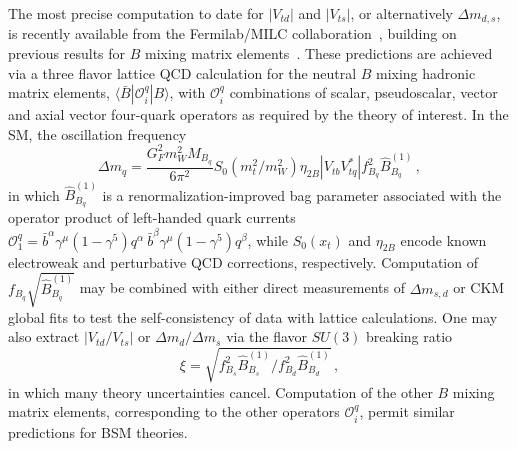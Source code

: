 The most precise computation to date for $|V_{td}|$ and $|V_{ts}|$, or alternatively $\Delta m_{d,s}$, is recently available from the Fermilab/MILC collaboration~\cite{Bazavov:2016nty}, building on previous results for $B$ mixing matrix elements~\cite{Aoki:2014nga,Carrasco:2013zta,Bazavov:2012zs,Albertus:2010nm,Gamiz:2009ku,Dalgic:2006gp}. These predictions are achieved via a three flavor lattice QCD  calculation for the neutral $B$ mixing hadronic matrix elements, $\langle \bar{B} | \mathcal{O}^q_i | B\rangle$, with $\mathcal{O}^q_i$ combinations of scalar, pseudoscalar, vector and axial vector four-quark operators as required by the theory of interest. In the SM, the oscillation frequency
\begin{equation}
	\label{eqn:SMDM}
	\Delta m_q = \frac{G_F^2 m_W^2 M_{B_q}}{6 \pi^2} S_0(m_t^2/m_W^2) \eta_{2 B}|V_{tb}V^*_{tq}| f_{B_q}^2 \hat{B}^{(1)}_{B_q}\,,
\end{equation}
in which $\hat{B}^{(1)}_{B_q}$ is a renormalization-improved bag parameter associated with the operator product of left-handed quark currents $\mathcal{O}^q_1 = \bar{b}^\alpha\gamma^\mu(1-\gamma^5) q^\alpha~\bar{b}^\beta \gamma^\mu(1-\gamma^5) q^\beta$, while $S_0(x_t)$ and $\eta_{2B}$ encode known electroweak and perturbative QCD corrections, respectively. Computation of $f_{B_q}\sqrt{\hat{B}^{(1)}_{B_q}}$ may be combined with either direct measurements of $\Delta m_{s,d}$ or CKM global fits to test the self-consistency of data with lattice calculations. One may also extract $|V_{td}/V_{ts}|$ or $\Delta m_d/\Delta m_s$ via the flavor $SU(3)$ breaking ratio 
\begin{equation}
\xi = \sqrt{f_{B_s}^2 \hat{B}^{(1)}_{B_s}/ f_{B_d}^2 \hat{B}^{(1)}_{B_d}}\,,
\end{equation}
in which many theory uncertainties cancel. Computation of the other $B$ mixing matrix elements, corresponding to the other operators $\mathcal{O}^q_i$, permit similar predictions for BSM theories.

